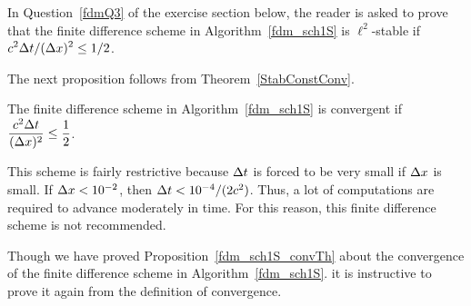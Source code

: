 In Question~\ref{fdmQ3} of the exercise section below, the reader is
asked to prove that the finite difference scheme in
Algorithm~\ref{fdm_sch1S} is $\ell^2$-stable if
$\displaystyle c^2\Delta{t}/(\Delta{x})^2 \leq 1/2$.

The next proposition follows from Theorem~\ref{StabConstConv}.

\begin{prop}\label{fdm_sch1S_convTh}
The finite difference scheme in Algorithm~\ref{fdm_sch1S} is
convergent if
$\displaystyle \frac{c^2\Delta{t}}{(\Delta{x})^2} \leq \frac{1}{2}$.
\end{prop}

This scheme is fairly restrictive because $\Delta{t}$ is forced
to be very small if $\Delta{x}$ is small.  If $\Delta{x} < 10^{-2}$, then
$\Delta{t} <  10^{-4}/(2c^2)$.  Thus, a lot of computations
are required to advance moderately in time.  For this reason, this
finite difference scheme is not recommended.

Though we have proved Proposition~\ref{fdm_sch1S_convTh} about
the convergence of the finite difference scheme in
Algorithm~\ref{fdm_sch1S}. it is instructive to prove it again from the
definition of convergence.

